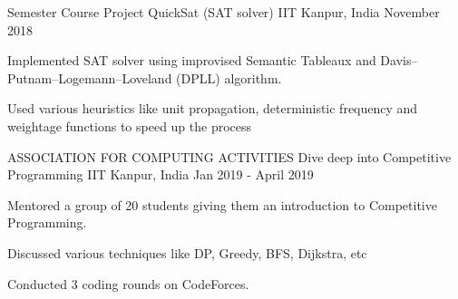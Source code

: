 

\begin{cventries}

  \cventry
    {Semester Course Project} %
    {QuickSat (SAT solver)} %
    {IIT Kanpur, India} %
    {November 2018} %
    {
      \begin{cvitems} %
        \item { Implemented SAT solver using improvised Semantic Tableaux and
        Davis–Putnam–Logemann–Loveland (DPLL) algorithm.}
        \item{Used various heuristics like unit propagation, deterministic frequency
        and weightage functions to speed up the process}
      \end{cvitems}
    }

  \cventry
    {ASSOCIATION FOR COMPUTING ACTIVITIES} %
    {Dive deep into Competitive Programming} %
    {IIT Kanpur, India} %
    {Jan 2019 - April 2019} %
    {
      \begin{cvitems} %
        \item {Mentored a group of 20 students giving them an introduction to Competitive Programming.}
        \item{Discussed various techniques like DP, Greedy, BFS, Dijkstra, etc}
        \item{Conducted 3 coding rounds on CodeForces.}
      \end{cvitems}
    }




\end{cventries}
